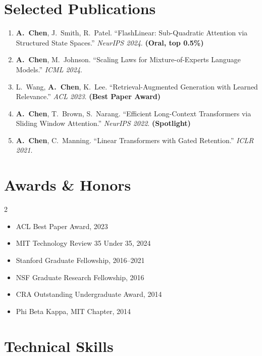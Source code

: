 \documentclass[11pt,a4paper]{article}
\begin{document}
\section{Selected Publications}
{\small
\begin{enumerate}[leftmargin=1.5em, itemsep=3pt]
  \item \textbf{A.\ Chen}, J.\ Smith, R.\ Patel. ``FlashLinear: Sub-Quadratic Attention via Structured State Spaces.'' \textit{NeurIPS 2024}. \textbf{(Oral, top 0.5\%)}
  \item \textbf{A.\ Chen}, M.\ Johnson. ``Scaling Laws for Mixture-of-Experts Language Models.'' \textit{ICML 2024}.
  \item L.\ Wang, \textbf{A.\ Chen}, K.\ Lee. ``Retrieval-Augmented Generation with Learned Relevance.'' \textit{ACL 2023}. \textbf{(Best Paper Award)}
  \item \textbf{A.\ Chen}, T.\ Brown, S.\ Narang. ``Efficient Long-Context Transformers via Sliding Window Attention.'' \textit{NeurIPS 2022}. \textbf{(Spotlight)}
  \item \textbf{A.\ Chen}, C.\ Manning. ``Linear Transformers with Gated Retention.'' \textit{ICLR 2021}.
\end{enumerate}
}

\section{Awards \& Honors}

\begin{multicols}{2}
\begin{itemize}[leftmargin=1.5em, nosep, itemsep=3pt]
  \item ACL Best Paper Award, 2023
  \item MIT Technology Review 35 Under 35, 2024
  \item Stanford Graduate Fellowship, 2016--2021
  \item NSF Graduate Research Fellowship, 2016
  \item CRA Outstanding Undergraduate Award, 2014
  \item Phi Beta Kappa, MIT Chapter, 2014
\end{itemize}
\end{multicols}

\section{Technical Skills}
\end{document}

